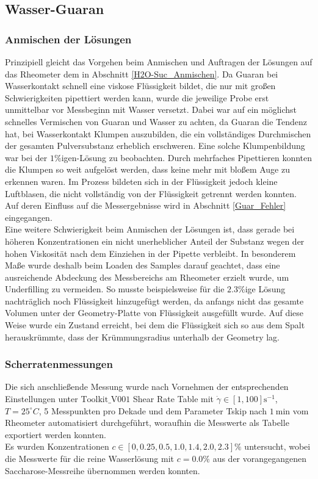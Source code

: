 \documentclass[11pt,a4paper,oneside]{scrartcl}
\begin{document}
\subsection{Wasser-Guaran}
\subsubsection{Anmischen der Lösungen}\label{anmischen_guaran}
Prinzipiell gleicht das Vorgehen beim Anmischen und Auftragen der Lösungen auf das Rheometer dem in Abschnitt \ref{H2O-Suc_Anmischen}. Da Guaran bei Wasserkontakt schnell eine viskose Flüssigkeit bildet, die nur mit großen Schwierigkeiten pipettiert werden kann, wurde die jeweilige Probe erst unmittelbar vor Messbeginn mit Wasser versetzt. Dabei war auf ein möglichst schnelles Vermischen von Guaran und Wasser zu achten, da Guaran die Tendenz hat, bei Wasserkontakt Klumpen auszubilden, die ein vollständiges Durchmischen der gesamten Pulversubstanz erheblich erschweren. Eine solche Klumpenbildung war bei der $1\%$igen-Lösung zu beobachten. Durch mehrfaches Pipettieren konnten die Klumpen so weit aufgelöst werden, dass keine mehr mit bloßem Auge zu erkennen waren. Im Prozess bildeten sich in der Flüssigkeit jedoch kleine Luftblasen, die nicht vollständig von der Flüssigkeit getrennt werden konnten. Auf deren Einfluss auf die Messergebnisse wird in Abschnitt \ref{Guar_Fehler} eingegangen.\\
Eine weitere Schwierigkeit beim Anmischen der Lösungen ist, dass gerade bei höheren Konzentrationen ein nicht unerheblicher Anteil der Substanz wegen der hohen Viskosität nach dem Einziehen in der Pipette verbleibt. In besonderem Maße wurde deshalb beim Loaden des Samples darauf geachtet, dass eine ausreichende Abdeckung des Messbereichs am Rheometer erzielt wurde, um Underfilling zu vermeiden. So musste beispielsweise für die $2.3\%$ige Lösung nachträglich noch Flüssigkeit hinzugefügt werden, da anfangs nicht das gesamte Volumen unter der Geometry-Platte von Flüssigkeit ausgefüllt wurde. Auf diese Weise wurde ein Zustand erreicht, bei dem die Flüssigkeit sich so aus dem Spalt herauskrümmte, dass der Krümmungsradius unterhalb der Geometry lag.
\subsubsection{Scherratenmessungen}
Die sich anschließende Messung wurde nach Vornehmen der entsprechenden Einstellungen unter $\mathrm{Toolkit\_V001}$ Shear Rate Table mit $\dot\gamma\in[1,100]\mathrm s^{-1}$, $T=25^\circ C$, 5 Messpunkten pro Dekade und dem Parameter Tskip nach $1\ \mathrm{min}$ vom Rheometer automatisiert durchgeführt, woraufhin die Messwerte als Tabelle exportiert werden konnten.\\
Es wurden Konzentrationen $c\in[0,0.25,0.5,1.0,1.4,2.0,2.3]\%$ untersucht, wobei die Messwerte für die reine Wasserlösung mit $c=0.0\%$ aus der vorangegangenen Saccharose-Messreihe übernommen werden konnten.
\end{document}

